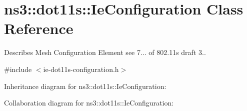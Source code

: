 \hypertarget{classns3_1_1dot11s_1_1IeConfiguration}{}\section{ns3\+:\+:dot11s\+:\+:Ie\+Configuration Class Reference}
\label{classns3_1_1dot11s_1_1IeConfiguration}


Describes Mesh Configuration Element see 7... of 802.\+11s draft 3..  




{\ttfamily \#include $<$ie-\/dot11s-\/configuration.\+h$>$}



Inheritance diagram for ns3\+:\+:dot11s\+:\+:Ie\+Configuration\+:


Collaboration diagram for ns3\+:\+:dot11s\+:\+:Ie\+Configuration\+:
